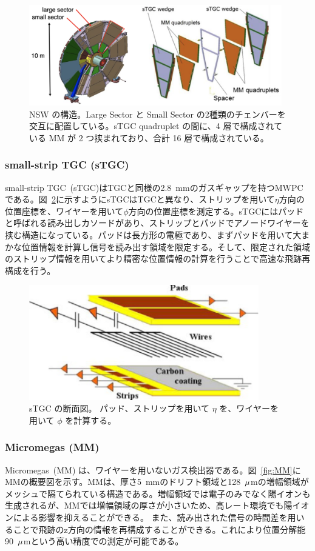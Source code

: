 \begin{figure}[tb]
  \centering
  \includegraphics[clip, width=11cm]{fig/2/nsw-structure.png}
  \caption{NSW の構造。Large Sector と Small Sector の2種類のチェンバーを交互に配置している。sTGC quadruplet の間に、4 層で構成されている MM が 2 つ挟まれており、合計 16 層で構成されている。}
  \label{fig:NSW}
\end{figure}

\subsubsection{small-strip TGC (sTGC)}
small-strip TGC~(sTGC)はTGCと同様の2.8~mmのガスギャップを持つMWPCである。図~\ref{fig:sTGC}に示すようにsTGCはTGCと異なり、ストリップを用いて$\eta$方向の位置座標を、ワイヤーを用いて$\phi$方向の位置座標を測定する。sTGCにはパッドと呼ばれる読み出しカソードがあり、ストリップとパッドでアノードワイヤーを挟む構造になっている。パッドは長方形の電極であり、まずパッドを用いて大まかな位置情報を計算し信号を読み出す領域を限定する。そして、限定された領域のストリップ情報を用いてより精密な位置情報の計算を行うことで高速な飛跡再構成を行う。

\begin{figure}[tb]
  \centering
  \includegraphics[clip, width=10cm]{fig/2/stgc-structure.pdf}
  \caption{sTGC の断面図。 パッド、ストリップを用いて $\eta$ を、ワイヤーを用いて $\phi$ を計算する。}
  \label{fig:sTGC}
\end{figure}

\subsubsection{Micromegas (MM)}
Micromegas~(MM) は、ワイヤーを用いないガス検出器である。図~\ref{fig:MM}にMMの概要図を示す。MMは、厚さ5~mmのドリフト領域と128~$\rm{\mu}$mの増幅領域がメッシュで隔てられている構造である。増幅領域では電子のみでなく陽イオンも生成されるが、MMでは増幅領域の厚さが小さいため、高レート環境でも陽イオンによる影響を抑えることができる。
また、読み出された信号の時間差を用いることで飛跡のz方向の情報を再構成することができる。これにより位置分解能90~$\rm{\mu}$mという高い精度での測定が可能である。

